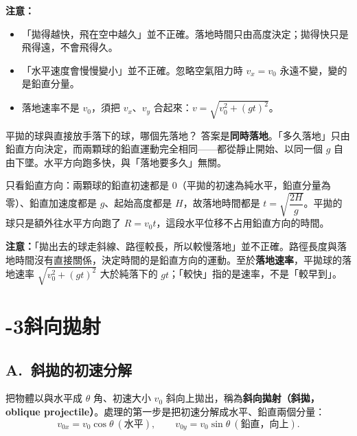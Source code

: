 \documentclass[11pt]{article}
\begin{document}
\textbf{注意：}
\begin{itemize}\setlength{\itemsep}{1pt}
\item 「拋得越快，飛在空中越久」並不正確。落地時間只由高度決定；拋得快只是飛得遠，不會飛得久。
\item 「水平速度會慢慢變小」並不正確。忽略空氣阻力時 $v_x=v_0$ 永遠不變，變的是鉛直分量。
\item 落地速率不是 $v_0$，須把 $v_x$、$v_y$ 合起來：$v=\sqrt{v_0^2+(gt)^2}$。
\end{itemize}

\begin{補充框}{平拋的球與直接放手落下的球，哪個先落地？}
答案是\textbf{同時落地}。「多久落地」只由鉛直方向決定，而兩顆球的鉛直運動完全相同——都從靜止開始、以同一個 $g$ 自由下墜。水平方向跑多快，與「落地要多久」無關。

只看鉛直方向：兩顆球的鉛直初速都是 $0$（平拋的初速為純水平，鉛直分量為零）、鉛直加速度都是 $g$、起始高度都是 $H$，故落地時間都是 $t=\sqrt{\dfrac{2H}{g}}$。平拋的球只是額外往水平方向跑了 $R=v_0 t$，這段水平位移不占用鉛直方向的時間。

\textbf{注意：}「拋出去的球走斜線、路徑較長，所以較慢落地」並不正確。路徑長度與落地時間沒有直接關係，決定時間的是鉛直方向的運動。至於\textbf{落地速率}，平拋球的落地速率 $\sqrt{v_0^2+(gt)^2}$ 大於純落下的 $gt$；「較快」指的是速率，不是「較早到」。
\end{補充框}


\section*{-3\quad 斜向拋射}

\subsection*{\sffamily A.\ 斜拋的初速分解}

把物體以與水平成 $\theta$ 角、初速大小 $v_0$ 斜向上拋出，稱為\textbf{斜向拋射（斜拋，oblique projectile）}。處理的第一步是把初速分解成水平、鉛直兩個分量：
$$v_{0x}=v_0\cos\theta\ (\text{水平}),\qquad v_{0y}=v_0\sin\theta\ (\text{鉛直，向上}).$$

\end{document}
